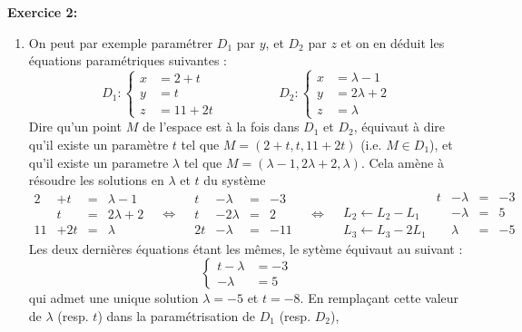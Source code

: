 \documentclass{article}
\begin{document}
\medskip
\noindent
\textbf{Exercice 2:}\\
\begin{enumerate}
\item 
On peut par exemple paramétrer $D_1$ par $y$, et $D_2$ par $z$ et on en déduit les équations paramétriques suivantes :
\[
D_1 :  
\begin{cases}
x &= 2+t \\
y&=t \\
z &=11+2t
\end{cases}
\hspace{2cm}
D_2 : 
\begin{cases}
x &= \lambda-1 \\
y & =2\lambda+2\\
z & = \lambda
\end{cases}\]
Dire qu'un point $M$ de l'espace est à la fois dans $D_1$ et $D_2$, équivaut à dire qu'il existe un 
paramètre $t$ tel que $M = (2+t,t,11+2t)$ (i.e. $M\in D_1$), et qu'il existe un parametre 
$\lambda$ tel que $M=(\lambda-1 , 2\lambda +2,\lambda)$. Cela amène à résoudre les solutions en 
$\lambda$ et $t$ du système 
\[ 
\begin{matrix}
2&+t&=&\lambda-1 \\
&t &= &2\lambda +2 \\
11&+2t &=&\lambda
\end{matrix} 
\hspace{10pt} \Leftrightarrow \hspace{10pt}
\begin{matrix}
t&-\lambda &=&- 3\\
t&-2\lambda &=&2 \\
2t&-\lambda &=&-11
\end{matrix}
\hspace{10pt} \Leftrightarrow \hspace{10pt}
\begin{matrix}
 &  t&-\lambda & =& -3 \\
L_2\leftarrow L_2-L_1 & &-\lambda &=&5 \\
L_3 \leftarrow L_3-2L_1 & & \lambda &=&-5
\end{matrix}
\]
Les deux dernières équations étant les mêmes, le sytème équivaut au suivant :
\[
\begin{cases}
  t-\lambda & = -3 \\
 -\lambda &=5 
\end{cases}\]
qui admet une unique solution 
$\lambda =-5$ et $t=-8$. En remplaçant cette valeur de $\lambda$ (resp. $t$) dans la 
paramétrisation de $D_1$ (resp. $D_2$), 

\end{enumerate}
\end{document}

